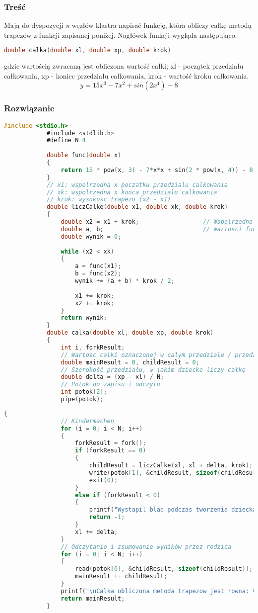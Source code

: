 		\subsubsection{Treść}
			Mają do dyspozycji \textit{n} węzłów klastra napisać funkcję, która obliczy całkę metodą trapezów z funkcji zapisanej poniżej. Nagłówek funkcji wygląda następująco:
			\begin{lstlisting}[language=C]
				double calka(double xl, double xp, double krok)
			\end{lstlisting}
			gdzie wartością zwracaną jest obliczona wartość całki; xl - początek przedziału całkowania, xp - koniec przedziału całkowania, krok - wartość kroku całkowania.
			$$ y=15x^3-7x^2+sin(2x^4)-8 $$
		\subsubsection{Rozwiązanie}
		\begin{lstlisting}[language=C]
			#include <stdio.h>
			#include <stdlib.h>
			#define N 4
			
			double func(double x)
			{
				return 15 * pow(x, 3) - 7*x*x + sin(2 * pow(x, 4)) - 8;
			}
			// x1: wspolrzedna x poczatku przedzialu calkowania
			// xk: wspolrzedna x konca przedzialu calkowania
			// krok: wysokosc trapezu (x2 - x1)
			double liczCalke(double x1, double xk, double krok)
			{
				double x2 = x1 + krok;					// Wspolrzedna x drugiej podstawy trapezu
				double a, b;							// Wartosci funkcji w x1, x2
				double wynik = 0;
				
				while (x2 < xk)
				{
					a = func(x1);
					b = func(x2);
					wynik += (a + b) * krok / 2;
					
					x1 += krok;
					x2 += krok;
				}
				return wynik;
			}
			double calka(double xl, double xp, double krok)
			{
				int i, forkResult;
				// Wartosc calki oznaczonej w calym przedziale / przedziale dziecka
				double mainResult = 0, childResult = 0;
				// Szerokość przedziału, w jakim dziecko liczy całkę
				double delta = (xp - xl) / N;
				// Potok do zapisu i odczytu
				int potok[2];
				pipe(potok);
		\end{lstlisting}	
		\newpage
		\begin{lstlisting}[language=C]
			{
				// Kindermachen
				for (i = 0; i < N; i++)
				{
					forkResult = fork();
					if (forkResult == 0)
					{
						childResult = liczCalke(xl, xl + delta, krok);
						write(potok[1], &childResult, sizeof(childResult));
						exit(0);
					}
					else if (forkResult < 0)
					{
						printf("Wystapil blad podczas tworzenia dziecka");
						return -1;
					}
					xl += delta;
				}
				// Odczytanie i zsumowanie wyników przez rodzica
				for (i = 0; i < N; i++)
				{
					read(potok[0], &childResult, sizeof(childResult));
					mainResult += childResult;
				}
				printf("\nCalka obliczona metoda trapezow jest rowna: %f\n", mainResult);
				return mainResult;
			}
		\end{lstlisting}
	\newpage 
